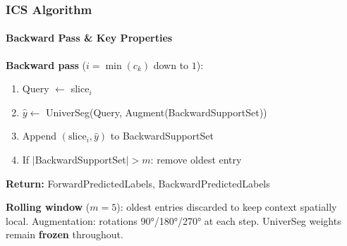 \documentclass[nometaot,lecture,amberg,toc=twocolumn,indicatelastpageofframe,footlinebox]{OTHAWbeamer}
\begin{document}
\begin{frame}
    \frametitle{ICS Algorithm }
    \framesubtitle{Backward Pass \& Key Properties}

    {\small
    \textcolor{lila1}{\textbf{Backward pass}} ($i = \min(c_k)$ down to $1$):
    \begin{enumerate}\itemsep6pt
        \item Query $\leftarrow$ slice$_i$
        \item $\hat{y} \leftarrow$ UniverSeg(Query, Augment(BackwardSupportSet))
        \item Append $(\text{slice}_i, \hat{y})$ to BackwardSupportSet
        \item If $|$BackwardSupportSet$| > m$: remove oldest entry
    \end{enumerate}

    \vspace{0.5em}
    \textbf{Return:} ForwardPredictedLabels, BackwardPredictedLabels

    \vspace{0.6em}
    \textcolor{orange1}{\textbf{Rolling window}} ($m = 5$): oldest entries discarded to keep context spatially local.
    Augmentation: rotations 90°/180°/270° at each step.
    UniverSeg weights remain \textbf{frozen} throughout.
    }

\end{frame}
\end{document}
